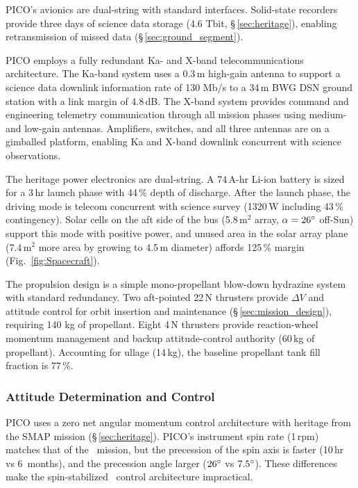 PICO's avionics are dual-string with standard interfaces. Solid-state recorders provide three days of science data storage (4.6 Tbit, \S\,\ref{sec:heritage}), enabling retransmission of missed data (\S\,\ref{sec:ground_segment}).

PICO employs a fully redundant Ka- and X-band telecommunications
architecture. The Ka-band system uses a 0.3\,m high-gain antenna to
support a science data downlink information rate of 130 Mb/s to a
34\,m BWG DSN ground station with a link margin of 4.8\,dB. The X-band
system provides command and engineering telemetry communication
through all mission phases using medium- and low-gain
antennas. Amplifiers, switches, and all three antennas are on a
gimballed platform, enabling Ka and X-band downlink concurrent with
science observations.

 The heritage power electronics are dual-string.
A 74\,A-hr Li-ion battery is sized for a 3\,hr launch phase with 44\,\% depth of discharge.
After the launch phase, the driving
mode is telecom concurrent with science survey (1320\,W including 43\,\% contingency).
Solar cells on the aft side of the bus (5.8\,m$^2$ array, $\alpha=26^\circ$ off-Sun) support this mode with positive power,  and unused area in the solar array plane (7.4\,m$^2$ more area by growing to 4.5\,m diameter) affords 125\,\% margin
(Fig.~\ref{fig:Spacecraft}).

The propulsion design is a simple mono-propellant blow-down hydrazine
system with standard redundancy. Two aft-pointed 22\,N thrusters
provide $\Delta V$ and attitude control for orbit insertion and
maintenance (\S\,\ref{sec:mission_design}), requiring 140 kg of
propellant.  Eight 4\,N thrusters provide reaction-wheel momentum
management and backup attitude-control authority (60\,kg of
propellant). Accounting for ullage (14\,kg), the baseline propellant
tank fill fraction is 77\,\%.


\subsubsection{Attitude Determination and Control}
\label{sec:attitude_determination} %

PICO uses a zero net angular momentum control architecture with heritage from the SMAP mission (\S\,\ref{sec:heritage}). PICO's instrument spin rate (1\,rpm) matches that of the \planck\ mission, but the precession of the spin axis is faster (10\,hr vs 6\, months), and the precession angle larger ($26^\circ$ vs $7.5^\circ$). These differences make the spin-stabilized \planck \ control architecture impractical. 

